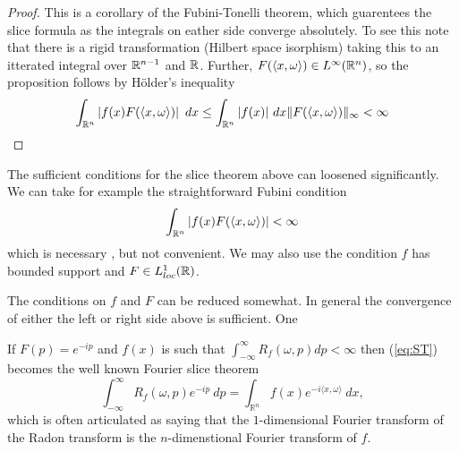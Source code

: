 \begin{proof}
  This is a corollary of the Fubini-Tonelli theorem, which guarentees the slice formula as the integrals on eather side converge absolutely. To see this note that there is a rigid transformation (Hilbert space isorphism) taking this to an itterated integral over $\mathbb{R}^{n-1}$ and $\mathbb{R}$. Further, $F(\langle x, \omega \rangle) \in L^\infty(\mathbb{R}^n)$, so the proposition follows by H\"older's inequality
  \[
    \int_{\mathbb{R}^n} \left|f(x) F(\langle x, \omega \rangle)\right| ~dx \leq \int_{\mathbb{R}^n}|f(x)| ~dx \|F(\langle x, \omega \rangle)\|_\infty <  \infty
  \] 
\end{proof}

\begin{remark}
  The sufficient conditions for the slice theorem above can loosened significantly. We can take for example the straightforward Fubini condition 
  \[
      \int_{\mathbb{R}^n} |f(x)F(\langle x, \omega \rangle )| < \infty
  \]
  which is necessary \cn, but not convenient. We may also use the condition $f$ has bounded support and $F \in L^1_{loc}(\mathbb{R})$.

  The conditions on $f$ and $F$ can be reduced somewhat. In general the convergence of either the left or right side above is sufficient. One 
\end{remark}

If $F(p) = e^{-ip}$ and $f(x)$ is such that $\int_{-\infty}^\infty R_f(\omega, p) dp < \infty$ then (\ref{eq:ST}) becomes the well known Fourier slice theorem
\[
  \int_{-\infty}^\infty R_f(\omega, p) e^{-ip} ~dp
  = \int_{\mathbb{R}^n} f(x) e^{-i\langle x, \omega\rangle} ~dx,
\]
which is often articulated as saying that the $1$-dimensional Fourier transform of the Radon transform is the $n$-dimenstional Fourier transform of $f$.


